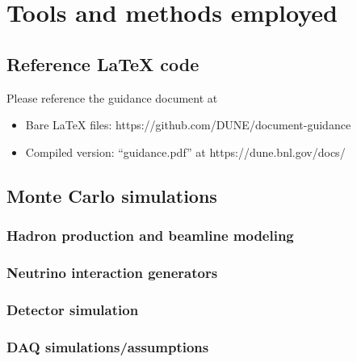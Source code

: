 \chapter{Tools and methods employed}
\label{ch:tools}


\section{Reference LaTeX code}

Please reference the guidance document at 

\begin{itemize}
\item Bare LaTeX files: https://github.com/DUNE/document-guidance
\item Compiled version: ``guidance.pdf'' at https://dune.bnl.gov/docs/
\end{itemize}


\section{Monte Carlo simulations}
\label{sec:tools-mc}

\subsection{Hadron production and beamline modeling}
\label{sec:tools-mc-had-beam}

\subsection{Neutrino interaction generators} 
\label{sec:tools-mc-gen}


\subsection{Detector simulation}
\label{sec:tools-mc-detsim}

\subsection{DAQ simulations/assumptions}
\label{sec:tools-mc-daq}


